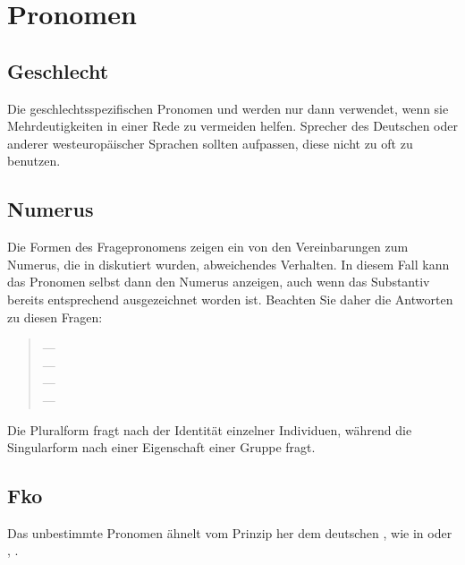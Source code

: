 \section{Pronomen}


\subsection{Geschlecht} Die geschlechtsspezifischen Pronomen  und 
werden nur dann verwendet, wenn sie Mehrdeutigkeiten in einer Rede zu vermeiden
helfen. Sprecher des Deutschen oder anderer westeurop\"aischer Sprachen sollten
aufpassen, diese nicht zu oft zu benutzen.\label{syn:pron:gender}

\subsection{Numerus} Die Formen des Fragepronomens  zeigen ein von den
Vereinbarungen zum Numerus, die in  diskutiert wurden,
abweichendes Verhalten.\label{syn:pron:q-number}
In diesem Fall kann das Pronomen selbst dann den Numerus anzeigen, auch wenn das
Substantiv bereits entsprechend ausgezeichnet worden ist. Beachten Sie daher die
Antworten zu diesen Fragen:

\begin{quotation}
\noindent{} --- \\
\noindent{} --- \\

\noindent{} --- \\
\noindent{} ---\\
\indent{}
\end{quotation}

\noindent Die Pluralform fragt nach der Identit\"at einzelner Individuen, w\"ahrend
die Singularform nach einer Eigenschaft einer Gruppe fragt.

\subsection{Fko} Das unbestimmte Pronomen  \"ahnelt vom Prinzip her dem
deutschen , wie in  oder
, .

